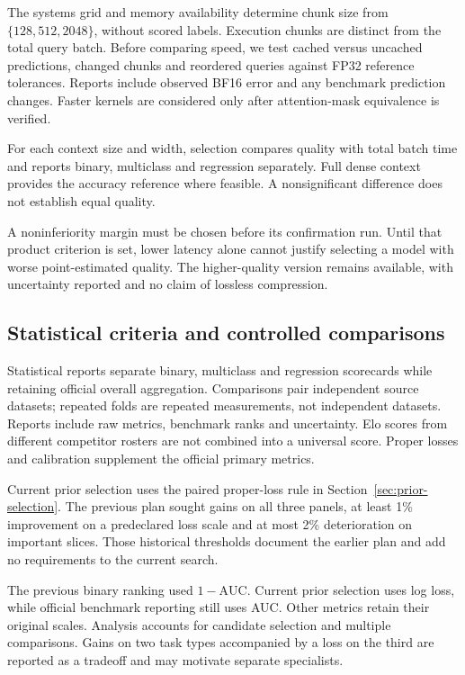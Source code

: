 \documentclass[11pt]{article}
\begin{document}
The systems grid and memory availability determine chunk size from $\{128,512,2048\}$, without scored labels. Execution chunks are distinct from the total query batch. Before comparing speed, we test cached versus uncached predictions, changed chunks and reordered queries against FP32 reference tolerances. Reports include observed BF16 error and any benchmark prediction changes. Faster kernels are considered only after attention-mask equivalence is verified.

For each context size and width, selection compares quality with total batch time and reports binary, multiclass and regression separately. Full dense context provides the accuracy reference where feasible. A nonsignificant difference does not establish equal quality.

A noninferiority margin must be chosen before its confirmation run. Until that product criterion is set, lower latency alone cannot justify selecting a model with worse point-estimated quality. The higher-quality version remains available, with uncertainty reported and no claim of lossless compression.

\subsection{Statistical criteria and controlled comparisons}

Statistical reports separate binary, multiclass and regression scorecards while retaining official overall aggregation. Comparisons pair independent source datasets; repeated folds are repeated measurements, not independent datasets. Reports include raw metrics, benchmark ranks and uncertainty. Elo scores from different competitor rosters are not combined into a universal score. Proper losses and calibration supplement the official primary metrics.

Current prior selection uses the paired proper-loss rule in Section~\ref{sec:prior-selection}. The previous plan sought gains on all three panels, at least 1\% improvement on a predeclared loss scale and at most 2\% deterioration on important slices. Those historical thresholds document the earlier plan and add no requirements to the current search.

The previous binary ranking used $1-\mathrm{AUC}$. Current prior selection uses log loss, while official benchmark reporting still uses AUC. Other metrics retain their original scales. Analysis accounts for candidate selection and multiple comparisons. Gains on two task types accompanied by a loss on the third are reported as a tradeoff and may motivate separate specialists.
\end{document}
